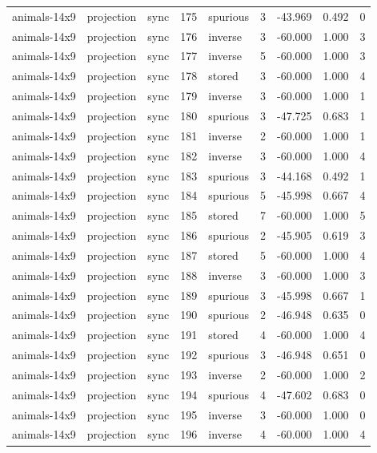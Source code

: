 \begin{tabular}{lllrlrrrr}
animals-14x9 & projection & sync & 175 & spurious & 3 & -43.969 & 0.492 & 0 \\
animals-14x9 & projection & sync & 176 & inverse & 3 & -60.000 & 1.000 & 3 \\
animals-14x9 & projection & sync & 177 & inverse & 5 & -60.000 & 1.000 & 3 \\
animals-14x9 & projection & sync & 178 & stored & 3 & -60.000 & 1.000 & 4 \\
animals-14x9 & projection & sync & 179 & inverse & 3 & -60.000 & 1.000 & 1 \\
animals-14x9 & projection & sync & 180 & spurious & 3 & -47.725 & 0.683 & 1 \\
animals-14x9 & projection & sync & 181 & inverse & 2 & -60.000 & 1.000 & 1 \\
animals-14x9 & projection & sync & 182 & inverse & 3 & -60.000 & 1.000 & 4 \\
animals-14x9 & projection & sync & 183 & spurious & 3 & -44.168 & 0.492 & 1 \\
animals-14x9 & projection & sync & 184 & spurious & 5 & -45.998 & 0.667 & 4 \\
animals-14x9 & projection & sync & 185 & stored & 7 & -60.000 & 1.000 & 5 \\
animals-14x9 & projection & sync & 186 & spurious & 2 & -45.905 & 0.619 & 3 \\
animals-14x9 & projection & sync & 187 & stored & 5 & -60.000 & 1.000 & 4 \\
animals-14x9 & projection & sync & 188 & inverse & 3 & -60.000 & 1.000 & 3 \\
animals-14x9 & projection & sync & 189 & spurious & 3 & -45.998 & 0.667 & 1 \\
animals-14x9 & projection & sync & 190 & spurious & 2 & -46.948 & 0.635 & 0 \\
animals-14x9 & projection & sync & 191 & stored & 4 & -60.000 & 1.000 & 4 \\
animals-14x9 & projection & sync & 192 & spurious & 3 & -46.948 & 0.651 & 0 \\
animals-14x9 & projection & sync & 193 & inverse & 2 & -60.000 & 1.000 & 2 \\
animals-14x9 & projection & sync & 194 & spurious & 4 & -47.602 & 0.683 & 0 \\
animals-14x9 & projection & sync & 195 & inverse & 3 & -60.000 & 1.000 & 0 \\
animals-14x9 & projection & sync & 196 & inverse & 4 & -60.000 & 1.000 & 4 \\

\end{tabular}

